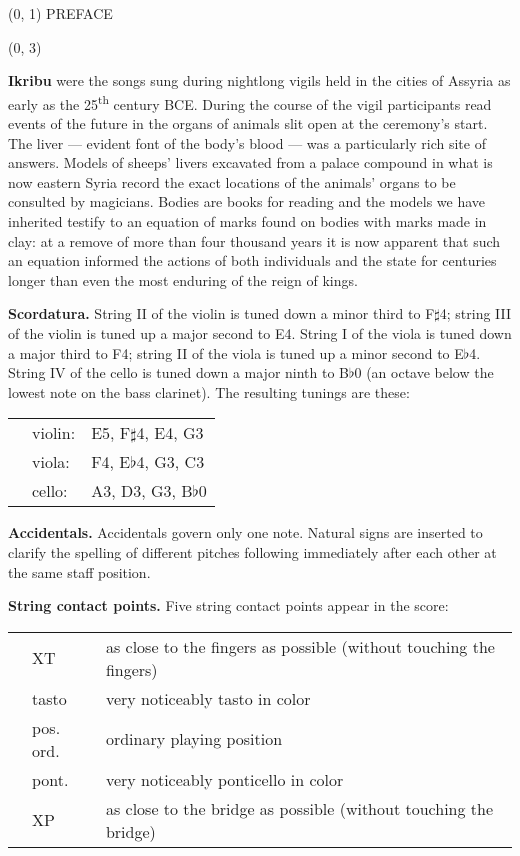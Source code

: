 \documentclass[10pt]{article}
\begin{document}
\begin{textblock}{23}(0, 1)
\center \huge PREFACE
\end{textblock}

\begin{textblock}{23}(0, 3)

\textbf{Ikribu} were the songs sung during nightlong vigils held in the cities
of Assyria as early as the 25\textsuperscript{th} century BCE. During the
course of the vigil participants read events of the future in the organs of
animals slit open at the ceremony's start. The liver --- evident font of the
body's blood --- was a particularly rich site of answers. Models of sheeps'
livers excavated from a palace compound in what is now eastern Syria record the
exact locations of the animals' organs to be consulted by magicians. Bodies are
books for reading and the models we have inherited testify to an equation of
marks found on bodies with marks made in clay: at a remove of more than four
thousand years it is now apparent that such an equation informed the actions of
both individuals and the state for centuries longer than even the most enduring
of the reign of kings.

\textbf{Scordatura.} String II of the violin is tuned down a minor third to
F$\sharp$4; string III of the violin is tuned up a major second to E4. String I
of the viola is tuned down a major third to F4; string II of the viola is tuned
up a minor second to E$\flat$4. String IV of the cello is tuned down a major
ninth to B$\flat$0 (an octave below the lowest note on the bass clarinet). The
resulting tunings are these:

\begin{tabu}{l l l}
\phantom{M} & violin: & E5, F$\sharp$4, E4, G3 \\
            & viola: & F4, E$\flat$4, G3, C3 \\
            & cello: & A3, D3, G3, B$\flat$0 \\
\end{tabu}

\textbf{Accidentals.} Accidentals govern only one note. Natural signs are
inserted to clarify the spelling of different pitches following immediately
after each other at the same staff position.

\textbf{String contact points.} Five string contact points appear in the score:

\begin{tabu}{l l l}
\phantom{M} & XT & as close to the fingers as possible (without touching the fingers) \\
            & tasto & very noticeably tasto in color\\
            & pos. ord. & ordinary playing position \\
            & pont. & very noticeably ponticello in color \\
            & XP & as close to the bridge as possible (without touching the bridge) \\
\end{tabu}


\end{textblock}
\end{document}
